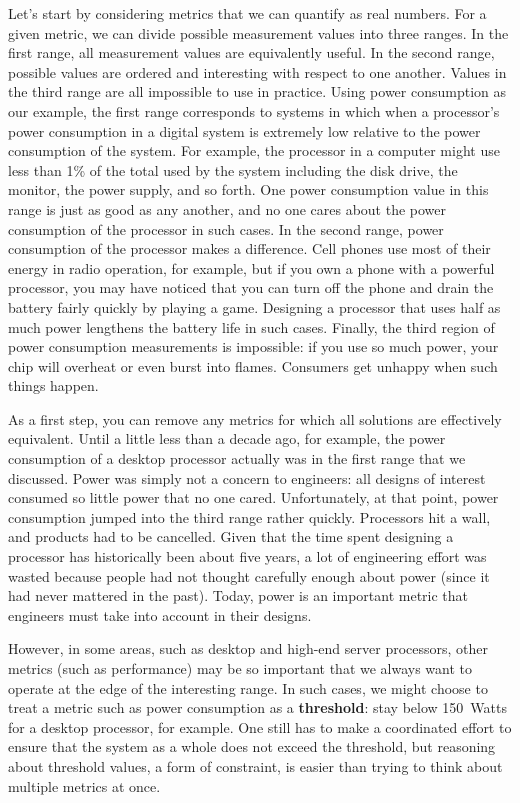 Let's start by considering metrics that we can quantify as real
numbers.
%
For a given metric, we can divide possible measurement values into
three ranges.
%
In the first range,
all measurement values are equivalently useful.
In the second range, 
possible values are ordered and interesting with respect to
one another.
Values in the third range are all impossible to use in practice.
Using power consumption as
our example, the first range corresponds to systems in which
when a processor's power consumption in a digital 
system is extremely low relative to the
power consumption
of the system.
For example, the processor in a computer might use less than 1\% 
of the total used by 
the system including the disk drive, the monitor, the power 
supply, and so forth.  One power consumption value in this range 
is just as good as any
another, and no one cares about the power consumption of the processor 
in such cases.  In the second range, power consumption of the
processor makes a difference.  Cell phones use most of their energy
in radio operation, for example, but if you own a phone with a powerful
processor, you may have noticed that you can turn off the phone and 
drain the battery fairly quickly by playing a game.  Designing a
processor that uses half as much power lengthens the battery life in
such cases.  Finally,
the third region of power consumption measurements is impossible:
if you use so much power, your chip will overheat or even burst
into flames.  Consumers get unhappy when such things happen.

As a first step, you can remove any metrics for which all solutions
are effectively equivalent.
%
Until a little less than a decade ago, for example, the power 
consumption of a desktop
processor actually was in the first range that we discussed.  Power
was simply not a concern to engineers: all designs of 
interest consumed so little power that no one cared.
%
Unfortunately, at that point, power consumption jumped into the
third range rather quickly.  Processors hit a wall, and 
products had to be cancelled.  Given that the time spent designing
a processor has historically
been about five years, a lot of engineering effort
was wasted because people had not thought carefully enough about
power (since it had never mattered in the past).
%
Today, power is an important metric that engineers must take into
account in their designs. 

However, in some areas, such as desktop and high-end server
processors,
other metrics (such as performance) may be so 
important that we always want to operate at the edge of the
interesting range.  In such cases, we might choose to treat 
a metric such as power consumption as a {\bf threshold}: stay
below 150~Watts for a desktop processor, for example.  One still
has to make a coordinated effort to ensure that the system as
a whole does not exceed the threshold, but reasoning about 
threshold values, a form of constraint, is easier than trying to
think about multiple metrics at once.

